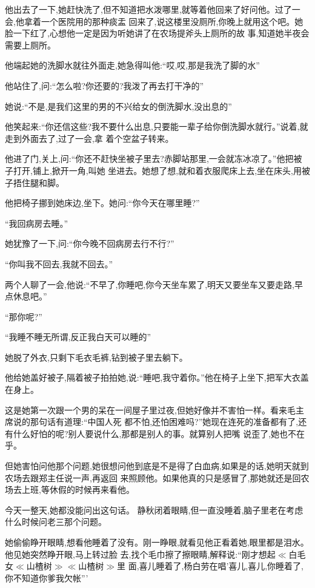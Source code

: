 ﻿\documentclass[12pt]{article}
\begin{document}
他出去了一下,她赶快洗了,但不知道把水泼哪里,就等着他回来了好问他。过了一会,他拿着一个医院用的那种痰盂
回来了,说这楼里没厕所,你晚上就用这个吧。她脸一下红了,心想他一定是因为听她讲了在农场提斧头上厕所的故
事,知道她半夜会需要上厕所。

他端起她的洗脚水就往外面走,她急得叫他:``哎,哎,那是我\myrule 洗了脚的水\myrule ''

他站住了,问:``怎么啦?你还要的?我泼了再去打干净的\myrule ''

她说:``不是,是\myrule 我们这里的男的不兴\myrule 给女的倒\myrule 洗脚水\myrule ,没出息的\myrule ''

他笑起来:``你还信这些?我不要什么出息,只要能一辈子给你倒洗脚水就行。''说着,就走到外面去了,过了一会,拿
着个空盆子转来。

他进了门,关上,问:``你还不赶快坐被子里去?赤脚站那里,一会就冻冰凉了。''他把被子打开,铺上,掀开一角,叫她
坐进去。她想了想,就和着衣服爬床上去,坐在床头,用被子捂住腿和脚。

他把椅子挪到她床边,坐下。她问:``你\myrule 今天在哪里睡?''

``我回病房去睡。''

她犹豫了一下,问:``你\myrule 今晚不回病房去行不行?''

``你叫我不回去,我就不回去。''

两个人聊了一会,他说:``不早了,你睡吧,你今天坐车累了,明天又要坐车又要走路,早点休息吧。''

``那你呢?''

``我睡不睡无所谓,反正我白天可以睡的\myrule ''

她脱了外衣,只剩下毛衣毛裤,钻到被子里去躺下。

他给她盖好被子,隔着被子拍拍她,说:``睡吧,我守着你。''他在椅子上坐下,把军大衣盖在身上。

这是她第一次跟一个男的呆在一间屋子里过夜,但她好像并不害怕一样。看来毛主席说的那句话有道理:``中国人死
都不怕,还怕困难吗?''她现在连死的准备都有了,还有什么好怕的呢?别人要说什么,那都是别人的事。就算别人把嘴
说歪了,她也不在乎。

但她害怕问他那个问题,她很想问他到底是不是得了白血病,如果是的话,她明天就到农场去跟郑主任说一声,再返回
来照顾他。如果他真的只是感冒了,那她就还是回农场去上班,等休假的时候再来看他。

今天一整天,她都没能问出这句话。 静秋闭着眼睛,但一直没睡着,脑子里老在考虑什么时候问老三那个问题。

她偷偷睁开眼睛,想看他睡着了没有。刚一睁眼,就看见他正看着她,眼里都是泪水。他见她突然睁开眼,马上转过脸
去,找个毛巾擦了擦眼睛,解释说:``刚才\myrule 想起\myrule $\ll$白毛女$\ll$山楂树$\gg$$\ll$山楂树$\gg$里
面\myrule ,喜儿睡着了,杨白劳\myrule 在唱'喜儿,喜儿,你睡着了,你不知道\myrule 你爹我欠帐\myrule '''
\end{document}
